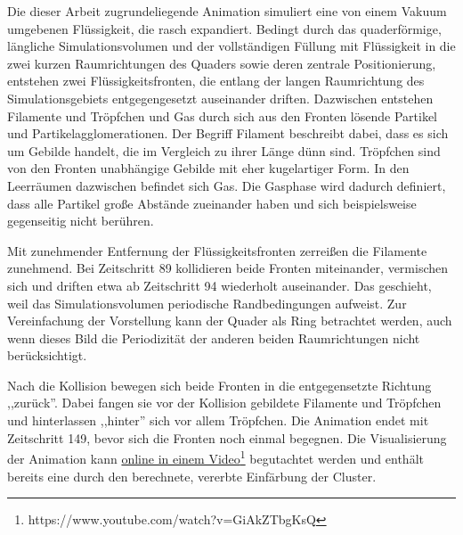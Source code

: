 Die dieser Arbeit zugrundeliegende Animation simuliert eine von einem Vakuum umgebenen Flüssigkeit, die rasch expandiert. Bedingt durch das quaderförmige, längliche Simulationsvolumen und der vollständigen Füllung mit Flüssigkeit in die zwei kurzen Raumrichtungen des Quaders sowie deren zentrale Positionierung, entstehen zwei Flüssigkeitsfronten, die entlang der langen Raumrichtung des Simulationsgebiets entgegengesetzt auseinander driften. Dazwischen entstehen Filamente und Tröpfchen und Gas durch sich aus den Fronten lösende Partikel und Partikelagglomerationen. Der Begriff Filament beschreibt dabei, dass es sich um Gebilde handelt, die im Vergleich zu ihrer Länge dünn sind. Tröpfchen sind von den Fronten unabhängige Gebilde mit eher kugelartiger Form. In den Leerräumen dazwischen befindet sich Gas. Die Gasphase wird dadurch definiert, dass alle Partikel große Abstände zueinander haben und sich beispielsweise gegenseitig nicht berühren.

Mit zunehmender Entfernung der Flüssigkeitsfronten zerreißen die Filamente zunehmend. Bei Zeitschritt 89 kollidieren beide Fronten miteinander, vermischen sich und driften etwa ab Zeitschritt 94 wiederholt auseinander. Das geschieht, weil das Simulationsvolumen periodische Randbedingungen aufweist. Zur Vereinfachung der Vorstellung kann der Quader als Ring betrachtet werden, auch wenn dieses Bild die Periodizität der anderen beiden Raumrichtungen nicht berücksichtigt.

Nach die Kollision bewegen sich beide Fronten in die entgegensetzte Richtung ,,zurück''. Dabei fangen sie vor der Kollision gebildete Filamente und Tröpfchen und hinterlassen ,,hinter'' sich vor allem Tröpfchen. Die Animation endet mit Zeitschritt 149, bevor sich die Fronten noch einmal begegnen. Die Visualisierung der Animation kann \href{https://www.youtube.com/watch?v=GiAkZTbgKsQ}{online in einem Video}\footnote{https://www.youtube.com/watch?v=GiAkZTbgKsQ} begutachtet werden und enthält bereits eine durch den \CFD berechnete, vererbte Einfärbung der Cluster.



